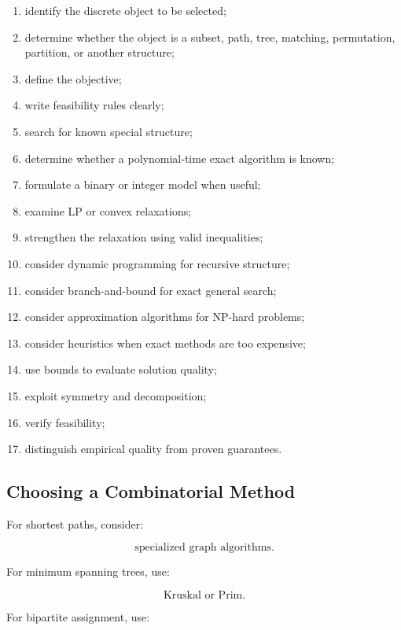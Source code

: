 \begin{enumerate}
    \item identify the discrete object to be selected;
    \item determine whether the object is a subset, path, tree, matching,
          permutation, partition, or another structure;
    \item define the objective;
    \item write feasibility rules clearly;
    \item search for known special structure;
    \item determine whether a polynomial-time exact algorithm is known;
    \item formulate a binary or integer model when useful;
    \item examine LP or convex relaxations;
    \item strengthen the relaxation using valid inequalities;
    \item consider dynamic programming for recursive structure;
    \item consider branch-and-bound for exact general search;
    \item consider approximation algorithms for NP-hard problems;
    \item consider heuristics when exact methods are too expensive;
    \item use bounds to evaluate solution quality;
    \item exploit symmetry and decomposition;
    \item verify feasibility;
    \item distinguish empirical quality from proven guarantees.
\end{enumerate}

\subsection{Choosing a Combinatorial Method}
\label{subsec:choosing-combinatorial-method}

For shortest paths, consider:

\[
\boxed{
\text{specialized graph algorithms}.
}
\]

For minimum spanning trees, use:

\[
\boxed{
\text{Kruskal or Prim}.
}
\]

For bipartite assignment, use:

